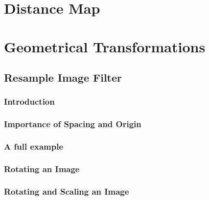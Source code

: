 



\section{Distance Map}
\label{sec:DistanceMap}





\section{Geometrical Transformations}
\label{sec:GeometricalTransformationFilters}

\subsection{Resample Image Filter}
\label{sec:ResampleImageFilter}

\subsubsection{Introduction}



\subsubsection{Importance of Spacing and Origin}


\subsubsection{A full example}


\subsubsection{Rotating an Image}


\subsubsection{Rotating and Scaling an Image}



